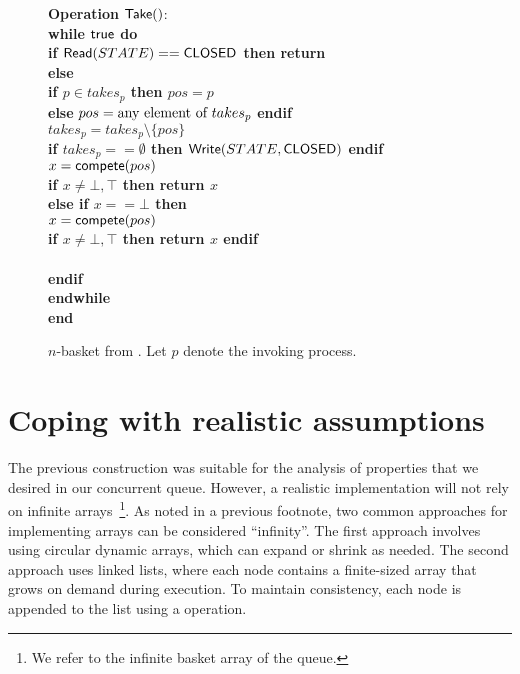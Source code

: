 \begin{figure}[ht!]
{{\begin{minipage}[t]{180mm}
\begin{tabbing}
{\bf Operation} ${\sf Take}()$: \\
 \> {\bf while \({\sf true}\) do}\\
 \> \> {\bf if \({\sf Read}(STATE) == {\sf CLOSED}\) then return \closed} \\
 \> \> {\bf else} \\
 \> \> \> {\bf if \(p \in takes_p\) then \(pos = p\)} \\
 \> \> \> {\bf else} \(pos = \hbox{any element of } takes_p\) {\bf endif} \\
 \> \> \> \(takes_p =  takes_p \setminus \{pos\}\) \\
 \> \> \> {\bf if \(takes_p == \emptyset\) then \({\sf Write}(STATE, {\sf CLOSED})\) endif} \\
 \> \> \> \( x = {\sf compete}(pos) \) \\
 \> \> \> {\bf if \(x \neq \bot, \top \) then return \(x\)} \\
 \> \> \> {\bf else if \(x == \bot\) then} \\
 \> \> \> \> \( x = {\sf compete}(pos) \) \\
 \> \> \> \> {\bf if \(x \neq \bot, \top \) then return \(x\) endif} \\
 \> \>  \\
 \> \> {\bf endif} \\
 \> {\bf endwhile}\\
{\bf end \Take}
\end{tabbing}
\end{minipage}}
\caption{\label{basket-2}$n$-basket from \CAS. Let $p$ denote the invoking process.}
}
\end{figure}

\section{Coping with realistic assumptions}

The previous construction was suitable for the analysis of properties that we desired in our concurrent queue. However, a realistic implementation will not rely on infinite arrays~\footnote{We refer to the infinite basket array of the queue.}. As noted in a previous footnote, two common approaches for implementing arrays can be considered ``infinity''. The first approach involves using circular dynamic arrays, which can expand or shrink as needed. The second approach uses linked lists, where each node contains a finite-sized array that grows on demand during execution. To maintain consistency, each node is appended to the list using a \CAS operation.


